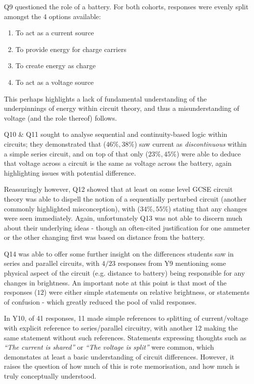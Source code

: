 \documentclass[a4paper,openany,nobib]{tufte-book}
\begin{document}
Q9 questioned the role of a battery. For both cohorts, responses were evenly split amongst the 4 options available:
\begin{enumerate}
	\item To act as a current source
	\item To provide energy for charge carriers
	\item To create energy as charge
	\item To act as a voltage source
\end{enumerate}
This perhaps highlights a lack of fundamental understanding of the underpinnings of energy within circuit theory, and thus a misunderstanding of voltage (and the role thereof) follows.

Q10 \& Q11 sought to analyse sequential and continuity-based logic within circuits; they demonstrated that ($46\%,38\%$) saw current as \emph{discontinuous} within a simple series circuit, and on top of that only ($23\%,45\%$) were able to deduce that voltage across a circuit is the same as voltage across the battery, again highlighting issues with potential difference.

Reassuringly however, Q12 showed that at least on some level GCSE circuit theory was able to dispell the notion of a sequentially perturbed circuit (another commonly highlighted misconception), with ($34\%,55\%$) stating that any changes were seen immediately. Again, unfortunately Q13 was not able to discern much about their underlying ideas - though an often-cited justification for one ammeter or the other changing first was based on distance from the battery.


Q14 was able to offer some further insight on the differences students saw in series and parallel circuits, with $4/23 $ responses from Y9 mentioning some physical aspect of the circuit (e.g. distance to battery) being responsible for any changes in brightness. An important note at this point is that most of the responses ($12$) were either simple statements on relative brightness, or statements of confusion - which greatly reduced the pool of valid responses.

In Y10, of 41 responses, 11 made simple references to splitting of current/voltage with explicit reference to series/parallel circuitry, with another 12 making the same statement without such references. Statements expressing thoughts such as \emph{``The current is shared''} or \emph{``The voltage is split''} were common, which demonstates at least a basic understanding of circuit differences. However, it raises the question of how much of this is rote memorisation, and how much is truly conceptually understood.
\end{document}
